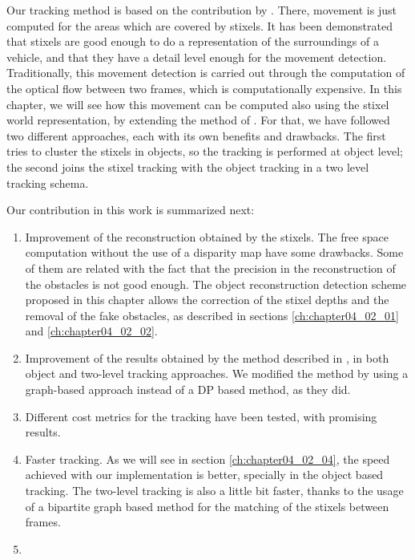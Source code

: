 Our tracking method is based on the contribution by \cite{gunyel2012stixels}. There, movement is just computed for the areas which are covered by stixels. It has been demonstrated that stixels are good enough to do a representation of the surroundings of a vehicle, and that they have a detail level enough for the movement detection. Traditionally, this movement detection is carried out through the computation of the optical flow between two frames, which is computationally expensive. In this chapter, we will see how this movement can be computed also using the stixel world representation, by extending the method of \cite{gunyel2012stixels}. For that, we have followed two different approaches, each with its own benefits and drawbacks. The first tries to cluster the stixels in objects, so the tracking is performed at object level; the second joins the stixel tracking with the object tracking in a two level tracking schema.

Our contribution in this work is summarized next:
\begin{enumerate}
 \item Improvement of the reconstruction obtained by the stixels. The free space computation without the use of a disparity map have some drawbacks. Some of them are related with the fact that the precision in the reconstruction of the obstacles is not good enough. The object reconstruction detection scheme proposed in this chapter allows the correction of the stixel depths and the removal of the fake obstacles, as described in sections \ref{ch:chapter04_02_01} and \ref{ch:chapter04_02_02}.
 \item Improvement of the results obtained by the method described in \cite{gunyel2012stixels}, in both object and two-level tracking approaches. We modified the method by using a graph-based approach instead of a \ac{DP} based method, as they did. 
 \item Different cost metrics for the tracking have been tested, with promising results. 
 \item Faster tracking. As we will see in section \ref{ch:chapter04_02_04}, the speed achieved with our implementation is better, specially in the object based tracking. The two-level tracking is also a little bit faster, thanks to the usage of a bipartite graph based method for the matching of the stixels between frames.
 \item {}
\end{enumerate}

